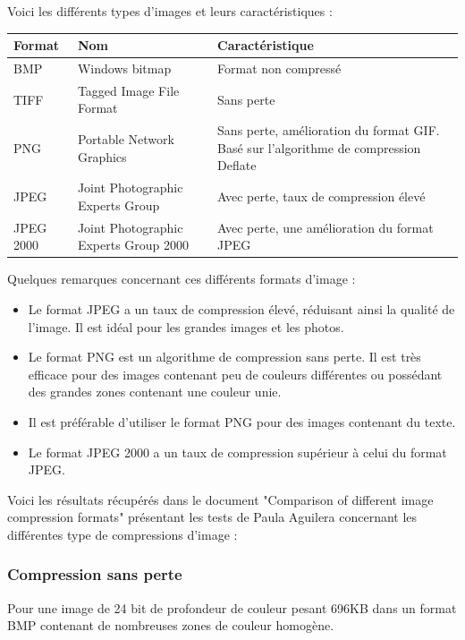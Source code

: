 \documentclass[a4paper, 11pt]{article} %
\begin{document}
Voici les différents types d'images et leurs caractéristiques : 

\begin{tabular}{|p{}|p{}|p{}|}
  \hline
  Format & Nom & Caractéristique\\\hline\hline
  BMP&Windows bitmap&Format non compressé\\\hline
	TIFF&Tagged Image File Format&Sans perte\\\hline
	PNG&Portable Network Graphics&Sans perte, amélioration du format GIF. Basé sur l'algorithme de compression Deflate\\\hline
	JPEG&Joint Photographic Experts Group&Avec perte, taux de compression élevé\\\hline
	JPEG 2000&Joint Photographic Experts Group 2000&Avec perte, une amélioration du format JPEG\\\hline
\end{tabular}

Quelques remarques concernant ces différents formats d'image : 

\begin{itemize}
  \item Le format JPEG a un taux de compression élevé, réduisant ainsi la qualité de l'image. Il est idéal pour les grandes images et les photos.
	\item Le format PNG est un algorithme de compression sans perte. Il est très efficace pour des images contenant peu de couleurs différentes ou possédant des grandes zones contenant une couleur unie.
	\item Il est préférable d'utiliser le format PNG pour des images contenant du texte.
	\item Le format JPEG 2000 a un taux de compression supérieur à celui du format JPEG.
\end{itemize}

Voici les résultats récupérés dans le document "Comparison of different image compression formats"\cite{compression:images-compression-formats} présentant les tests de Paula Aguilera concernant les différentes type de compressions d'image :

\subsubsection{Compression sans perte}
Pour une image de 24 bit de profondeur de couleur pesant 696KB dans un format BMP contenant de nombreuses zones de couleur homogène.
\end{document}
